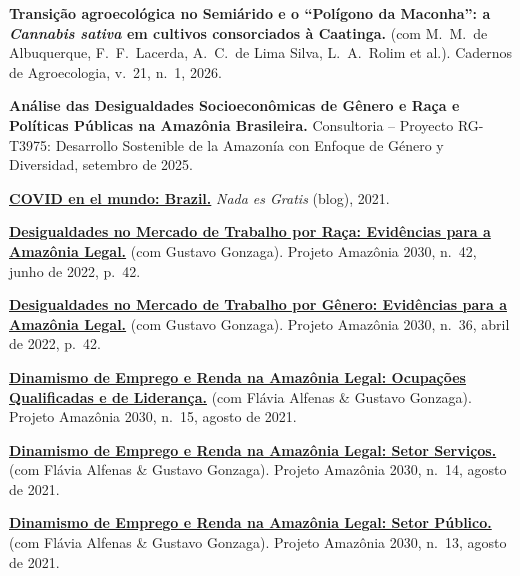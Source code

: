\documentclass[a4paper,9pt]{article}
\newcommand{\cvgap}{\vspace{2mm}}
\begin{document}
\begin{flushleft}

\textbf{Transição agroecológica no Semiárido e o ``Polígono da Maconha'': a \emph{Cannabis sativa} em cultivos consorciados à Caatinga.} (com M.~M.~de Albuquerque, F.~F.~Lacerda, A.~C.~de Lima Silva, L.~A.~Rolim et al.). Cadernos de Agroecologia, v.~21, n.~1, 2026.

\cvgap

\textbf{Análise das Desigualdades Socioeconômicas de Gênero e Raça e Políticas Públicas na Amazônia Brasileira.} Consultoria -- Proyecto RG-T3975: Desarrollo Sostenible de la Amazonía con Enfoque de Género y Diversidad, setembro de 2025.

\cvgap

\textbf{\href{https://nadaesgratis.es/judit-vall/covid-en-el-mundo-brazil}{COVID en el mundo: Brazil.}} \emph{Nada es Gratis} (blog), 2021.

\cvgap

\textbf{\href{https://amazonia2030.org.br/desigualdades-no-mercado-de-trabalho-por-raca-evidencias-para-a-amazonia-legal/}{Desigualdades no Mercado de Trabalho por Raça: Evidências para a Amazônia Legal.}} (com Gustavo Gonzaga). Projeto Amazônia 2030, n.~42, junho de 2022, p.~42.

\cvgap

\textbf{\href{https://amazonia2030.org.br/desigualdades-no-mercado-de-trabalho-por-genero-evidencias-para-a-amazonia-legal/}{Desigualdades no Mercado de Trabalho por Gênero: Evidências para a Amazônia Legal.}} (com Gustavo Gonzaga). Projeto Amazônia 2030, n.~36, abril de 2022, p.~42.

\cvgap

\textbf{\href{https://amazonia2030.org.br/dinamismo-de-emprego-e-renda-na-amazonia-legal-ocupacoes-qualificadas-e-de-lideranca/}{Dinamismo de Emprego e Renda na Amazônia Legal: Ocupações Qualificadas e de Liderança.}} (com Flávia Alfenas \& Gustavo Gonzaga). Projeto Amazônia 2030, n.~15, agosto de 2021.

\cvgap

\textbf{\href{https://amazonia2030.org.br/dinamismo-de-emprego-e-renda-na-amazonia-legal-servicos/}{Dinamismo de Emprego e Renda na Amazônia Legal: Setor Serviços.}} (com Flávia Alfenas \& Gustavo Gonzaga). Projeto Amazônia 2030, n.~14, agosto de 2021.

\cvgap

\textbf{\href{https://amazonia2030.org.br/dinamismo-de-emprego-e-renda-na-amazonia-legal-setor-publico/}{Dinamismo de Emprego e Renda na Amazônia Legal: Setor Público.}} (com Flávia Alfenas \& Gustavo Gonzaga). Projeto Amazônia 2030, n.~13, agosto de 2021.


\end{flushleft}
\end{document}

